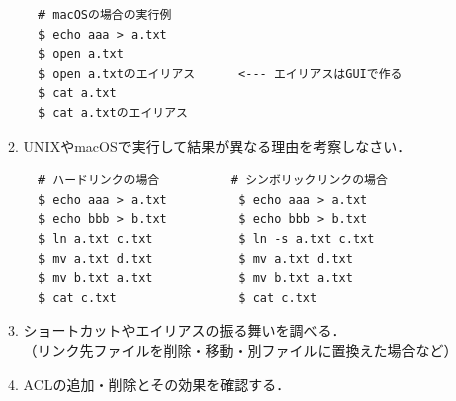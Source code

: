 \begin{enumerate}
\begin{enumerate}
\begin{lstlisting}
  # macOSの場合の実行例
  $ echo aaa > a.txt
  $ open a.txt
  $ open a.txtのエイリアス      <--- エイリアスはGUIで作る
  $ cat a.txt
  $ cat a.txtのエイリアス
\end{lstlisting} %
  \item UNIXやmacOSで実行して結果が異なる理由を考察しなさい．
\begin{lstlisting}
  # ハードリンクの場合          # シンボリックリンクの場合
  $ echo aaa > a.txt          $ echo aaa > a.txt
  $ echo bbb > b.txt          $ echo bbb > b.txt
  $ ln a.txt c.txt            $ ln -s a.txt c.txt
  $ mv a.txt d.txt            $ mv a.txt d.txt
  $ mv b.txt a.txt            $ mv b.txt a.txt
  $ cat c.txt                 $ cat c.txt
\end{lstlisting} %
  \item ショートカットやエイリアスの振る舞いを調べる．\\
    （リンク先ファイルを削除・移動・別ファイルに置換えた場合など）
  \item ACLの追加・削除とその効果を確認する．
  \end{enumerate}
\end{enumerate}
